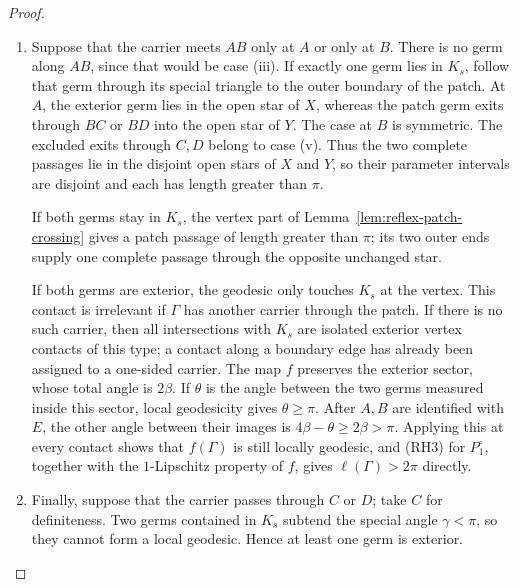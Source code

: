 \documentclass[12pt,a4paper]{article}
\theoremstyle{definition}
\begin{document}
\begin{proof}
\begin{enumerate}[label=\textup{(\roman*)},itemsep=0.35em,topsep=0.4em]
\item Suppose that the carrier meets \(AB\) only at \(A\) or only at \(B\).
There is no germ along \(AB\), since that would be case \textup{(iii)}.
If exactly one germ lies in \(K_s\), follow that germ through its special
triangle to the outer boundary of the patch. At \(A\), the exterior germ
lies in the open star of \(X\), whereas the patch germ exits through
\(BC\) or \(BD\) into the open star of \(Y\). The case at \(B\) is
symmetric. The excluded exits through \(C,D\) belong to case \textup{(v)}.
Thus the two complete passages lie in the disjoint open stars of \(X\)
and \(Y\), so their parameter intervals are disjoint and each has length
greater than \(\pi\).

If both germs stay in \(K_s\), the vertex part of
Lemma~\ref{lem:reflex-patch-crossing} gives a patch passage of length greater
than \(\pi\); its two outer ends supply one complete passage through the
opposite unchanged star.

If both germs are exterior, the geodesic only touches \(K_s\) at the vertex.
This contact is irrelevant if \(\Gamma\) has another carrier through the
patch.  If there is no such carrier, then all intersections with \(K_s\) are
isolated exterior vertex contacts of this type; a contact along a boundary
edge has already been assigned to a one-sided carrier.
The map \(f\) preserves the exterior sector, whose total angle is \(2\beta\).
If \(\theta\) is the angle between the two germs measured inside this sector,
local geodesicity gives \(\theta\ge\pi\).  After \(A,B\) are identified with
\(E\), the other angle between their images is \(4\beta-\theta\ge2\beta>
\pi\).  Applying this at every contact shows that \(f(\Gamma)\) is still
locally geodesic, and
\textup{(RH3)} for \(P_1^\circ\), together with the \(1\)-Lipschitz property
of \(f\), gives \(\ell(\Gamma)>2\pi\) directly.

\item Finally, suppose that the carrier passes through \(C\) or \(D\); take
\(C\) for definiteness. Two germs contained in \(K_s\) subtend the special
angle \(\gamma<\pi\), so they cannot form a local geodesic. Hence at least one
germ is exterior.


\end{enumerate}
\end{proof}
\end{document}
